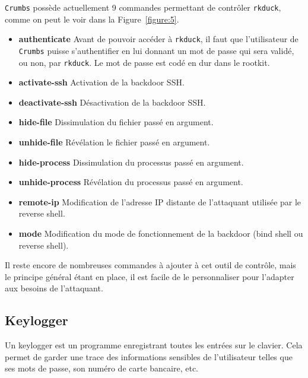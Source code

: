 \documentclass[12pt]{article}
\begin{document}
        \texttt{Crumbs} possède actuellement 9 commandes permettant de contrôler \texttt{rkduck}, comme on peut le voir dans la Figure~\ref{figure:5}.
        \begin{itemize}
            \item \textbf{authenticate} Avant de pouvoir accéder à \texttt{rkduck}, il faut que l'utilisateur de \texttt{Crumbs} puisse s'authentifier en lui donnant un mot de passe qui sera validé, ou non, par \texttt{rkduck}. Le mot de passe est codé en dur dans le rootkit.
            \item \textbf{activate-ssh} Activation de la backdoor SSH. 
            \item \textbf{deactivate-ssh} Désactivation de la backdoor SSH.
            \item \textbf{hide-file} Dissimulation du fichier passé en argument.
            \item \textbf{unhide-file} Révélation le fichier passé en argument.
            \item \textbf{hide-process} Dissimulation du processus passé en argument.
            \item \textbf{unhide-process} Révélation du processus passé en argument.
            \item \textbf{remote-ip} Modification de l'adresse IP distante de l'attaquant utilisée par le reverse shell.
            \item \textbf{mode} Modification du mode de fonctionnement de la backdoor (bind shell ou reverse shell).
        \end{itemize}
        
        Il reste encore de nombreuses commandes à ajouter à cet outil de contrôle, mais le principe général étant en place, il est facile de le personnaliser pour l'adapter aux besoins de l'attaquant.

    \subsection{Keylogger}
        
        Un keylogger est un programme enregistrant toutes les entrées sur le clavier. Cela permet de garder une trace des informations sensibles de l'utilisateur telles que ses mots de passe, son numéro de carte bancaire, etc. \\ 
        
        
\end{document}
